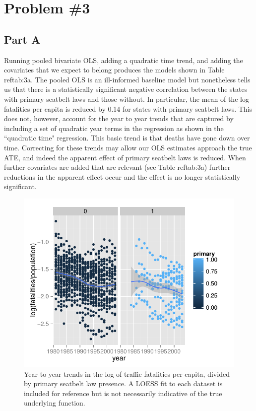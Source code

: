 \documentclass[letterpaper, 12pt]{article}
\begin{document}
\section{Problem \#3}
\subsection{Part A}
Running pooled bivariate OLS, adding a quadratic time trend, and adding the covariates that we expect to belong produces the models shown in Table ref{tab:3a}.  The pooled OLS is an ill-informed baseline model but nonetheless tells us that there is a statistically significant negative correlation between the states with primary seatbelt laws and those without.  In particular, the mean of the log fatalities per capita is reduced by 0.14 for states with primary seatbelt laws.  This does not, however, account for the year to year trends that are captured by including a set of quadratic year terms in the regression as shown in the ``quadratic time" regression.  This basic trend is that deaths have gone down over time.  Correcting for these trends may allow our OLS estimates approach the true ATE, and indeed the apparent effect of primary seatbelt laws is reduced.  When further covariates are added that are relevant (see Table ref{tab:3a}) further reductions in the apparent effect occur and the effect is no longer statistically significant.  


\begin{figure}[htbp]
\begin{center}
\includegraphics{plot3a.pdf}
\caption{Year to year trends in the log of traffic fatalities per capita, divided by primary seatbelt law presence.  A LOESS fit to each dataset is included for reference but is not necessarily indicative of the true underlying function.}
\label{fig:3a}
\end{center}
\end{figure}
\end{document}
